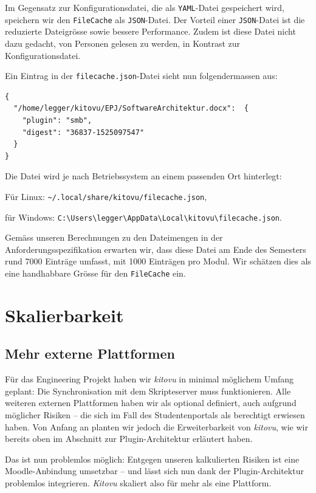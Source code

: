 \documentclass[a4paper]{article}
\let\oldsection\section
\renewcommand\section{\clearpage\oldsection}
\begin{document}
Im Gegensatz zur Konfigurationsdatei, die als \verb|YAML|-Datei gespeichert wird, speichern wir den \verb|FileCache| als \verb|JSON|-Datei. Der Vorteil einer \verb|JSON|-Datei ist die reduzierte Dateigrösse sowie bessere Performance. Zudem ist diese Datei nicht dazu gedacht, von Personen gelesen zu werden, in Kontrast zur Konfigurationsdatei.

Ein Eintrag in der \verb|filecache.json|-Datei sieht nun folgendermassen aus:

\begin{verbatim}
{
  "/home/legger/kitovu/EPJ/SoftwareArchitektur.docx":  {
    "plugin": "smb",
    "digest": "36837-1525097547"
  }
}
\end{verbatim}

Die Datei wird je nach Betriebssystem an einem passenden Ort hinterlegt: 

Für Linux: \verb|~/.local/share/kitovu/filecache.json|,

für Windows: \verb|C:\Users\legger\AppData\Local\kitovu\filecache.json|.

Gemäss unseren Berechnungen zu den Dateimengen in der Anforderungsspezifikation erwarten wir, dass diese Datei am Ende des Semesters rund 7000 Einträge umfasst, mit 1000 Einträgen pro Modul. Wir schätzen dies als eine handhabbare Grösse für den \verb|FileCache| ein.

\section{Skalierbarkeit}

\subsection{Mehr externe Plattformen}

Für das Engineering Projekt haben wir \emph{kitovu} in minimal möglichem Umfang geplant: Die Synchronisation mit dem Skripteserver muss funktionieren. Alle weiteren externen Plattformen haben wir als optional definiert, auch aufgrund möglicher Risiken -- die sich im Fall des Studentenportals als berechtigt erwiesen haben. Von Anfang an planten wir jedoch die Erweiterbarkeit von \emph{kitovu}, wie wir bereits oben im Abschnitt zur Plugin-Architektur erläutert haben. 

Das ist nun problemlos möglich: Entgegen unseren kalkulierten Risiken ist eine Moodle-Anbindung umsetzbar -- und lässt sich nun dank der Plugin-Architektur problemlos integrieren. \emph{Kitovu} skaliert also für mehr als eine Plattform.
\end{document}
